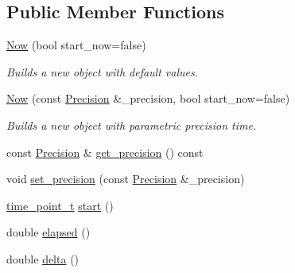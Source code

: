 \subsection*{Public Member Functions}
\begin{DoxyCompactItemize}
\item 
\hyperlink{class_designar_1_1_now_ad96b225953507a5a7853aef2c6b30641}{Now} (bool start\+\_\+now=false)
\begin{DoxyCompactList}\small\item\em Builds a new object with default values. \end{DoxyCompactList}\item 
\hyperlink{class_designar_1_1_now_ac98ba684b09b3ed28d8a615d59c01aa2}{Now} (const \hyperlink{class_designar_1_1_now_a3c9f5e57907c88cbe63c70a64638c072}{Precision} \&\+\_\+precision, bool start\+\_\+now=false)
\begin{DoxyCompactList}\small\item\em Builds a new object with parametric precision time. \end{DoxyCompactList}\item 
const \hyperlink{class_designar_1_1_now_a3c9f5e57907c88cbe63c70a64638c072}{Precision} \& \hyperlink{class_designar_1_1_now_a5f1a92bbd3bc6777749a0794d42b67c6}{get\+\_\+precision} () const
\item 
void \hyperlink{class_designar_1_1_now_aab4958d10eb970d40f3dcdf78a5f42e3}{set\+\_\+precision} (const \hyperlink{class_designar_1_1_now_a3c9f5e57907c88cbe63c70a64638c072}{Precision} \&\+\_\+precision)
\item 
\hyperlink{namespace_designar_a0edbd598eadb672df2c70e5af4dfccee}{time\+\_\+point\+\_\+t} \hyperlink{class_designar_1_1_now_a7ccb419799b46b7786b9ad0ac231de14}{start} ()
\item 
double \hyperlink{class_designar_1_1_now_a3219d85172fc9628ef90f66c1d69a8e0}{elapsed} ()
\item 
double \hyperlink{class_designar_1_1_now_ae2a46a7ff8392fbadc9fb28ee17f7f5a}{delta} ()
\end{DoxyCompactItemize}

